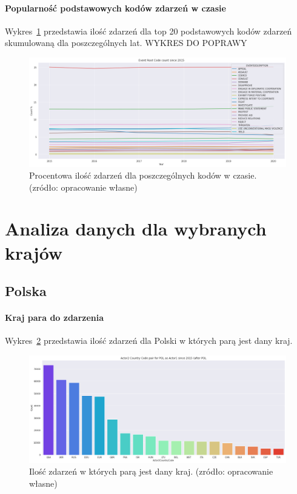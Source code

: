 \documentclass[11pt]{report}
\begin{document}
    \paragraph{Popularność podstawowych kodów zdarzeń w czasie}
    Wykres~\ref{fig:GLOBALERCperc} przedstawia ilość zdarzeń dla top 20 podstawowych kodów zdarzeń skumulowaną dla poszczególnych lat.
    WYKRES DO POPRAWY
    \begin{figure}[ht]
        \centering
        \includegraphics[width=1 \textwidth]{fig/GLOBAL/ERCperc.png}
        \caption{Procentowa ilość zdarzeń dla poszczególnych kodów w czasie. (zródło: opracowanie własne)}
        \label{fig:GLOBALERCperc}
    \end{figure}


    \section{Analiza danych dla wybranych krajów}

    \subsection{Polska}

    \paragraph{Kraj para do zdarzenia}


    Wykres~\ref{fig:PLpair} przedstawia ilość zdarzeń dla Polski w których parą jest dany kraj.

    \begin{figure}[ht]
        \centering
        \includegraphics[width=1 \textwidth]{fig/PL/PLactor2Pair.png}
        \caption{Ilość zdarzeń w których parą jest dany kraj. (zródło: opracowanie własne)}
        \label{fig:PLpair}
    \end{figure}
\end{document}
